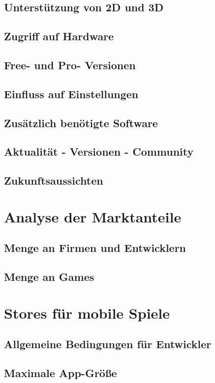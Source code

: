\section{Unterstützung von 2D und 3D}
\section{Zugriff auf Hardware}%
\section{Free- und Pro- Versionen}
\section{Einfluss auf Einstellungen}
\section{Zusätzlich benötigte Software}
\section{Aktualität - Versionen - Community}
\section{Zukunftsaussichten}

\chapter{Analyse der Marktanteile}
\section{Menge an Firmen und Entwicklern}
\section{Menge an Games}

\chapter{Stores für mobile Spiele}
\section{Allgemeine Bedingungen für Entwickler}
\section{Maximale App-Größe}
